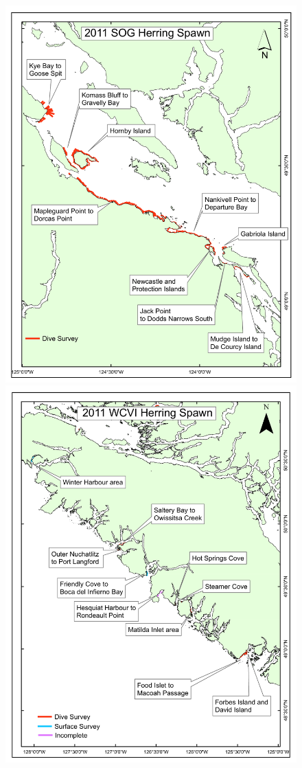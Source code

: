 \begin{figure}[!tbp]
	\includegraphics[scale=0.35]{../Figs/PBSfigs/2011_spawn_SOG_July13.pdf}\\
	\includegraphics[scale=0.35]{../Figs/PBSfigs/2011_spawn_WCVI_August16.pdf}

\end{figure}
